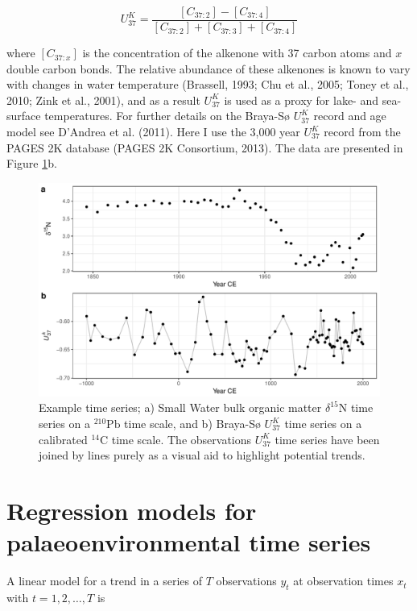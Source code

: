 \documentclass[12pt,]{article}
\newcommand{\uk}{\ensuremath{\mathit{U}^{\mathit{K}}_{\mathup{37}}}}
\begin{document}
\begin{equation*}
\uk{} = \frac{[C_{37:2}] - [C_{37:4}]}{[C_{37:2}] + [C_{37:3}]+ [C_{37:4}]}
\end{equation*}

where \([C_{37:x}]\) is the concentration of the alkenone with 37 carbon
atoms and \(x\) double carbon bonds. The relative abundance of these
alkenones is known to vary with changes in water temperature (Brassell,
1993; Chu et al., 2005; Toney et al., 2010; Zink et al., 2001), and as a
result \uk{} is used as a proxy for lake- and sea-surface temperatures.
For further details on the Braya-Sø \uk{} record and age model see
D'Andrea et al. (2011). Here I use the 3,000 year \uk{} record from the
PAGES 2K database (PAGES 2K Consortium, 2013). The data are presented in
Figure \ref{fig:data-figure}b.

\begin{figure}

{\centering \includegraphics[width=0.8\linewidth]{manuscript_files/figure-latex/data-figure-1} 

}

\caption{Example time series; a) Small Water bulk organic matter $\delta^{15}\text{N}$ time series on a ${}^{210}\text{Pb}$ time scale, and b) Braya-Sø \uk{} time series on a calibrated ${}^{14}\text{C}$ time scale. The observations \uk{} time series have been joined by lines purely as a visual aid to highlight potential trends.}\label{fig:data-figure}
\end{figure}

\section{Regression models for palaeoenvironmental time
series}\label{regression-models-for-palaeoenvironmental-time-series}

A linear model for a trend in a series of \(T\) observations \(y_t\) at
observation times \(x_t\) with \(t = 1, 2, \ldots, T\) is
\end{document}
